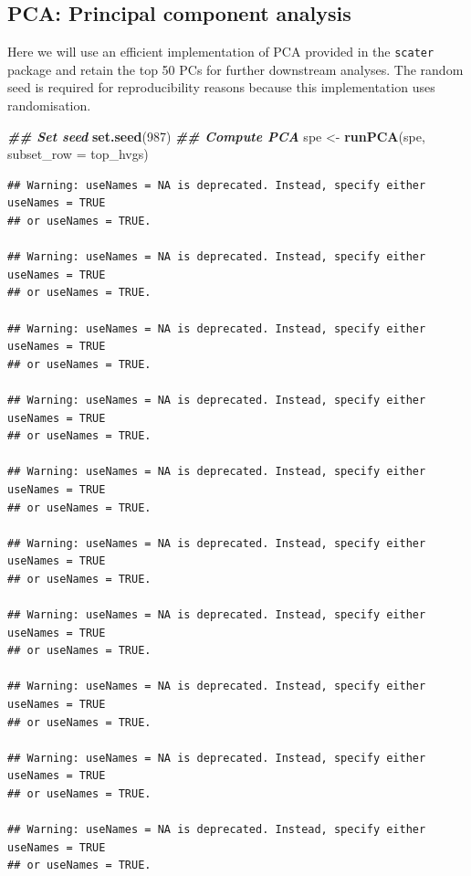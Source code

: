 \documentclass[
]{book}
\newenvironment{Shaded}{\begin{snugshade}}{\end{snugshade}}
\newcommand{\AttributeTok}[1]{\textcolor[rgb]{0.13,0.29,0.53}{#1}}
\newcommand{\DecValTok}[1]{\textcolor[rgb]{0.00,0.00,0.81}{#1}}
\newcommand{\DocumentationTok}[1]{\textcolor[rgb]{0.56,0.35,0.01}{\textbf{\textit{#1}}}}
\newcommand{\FunctionTok}[1]{\textcolor[rgb]{0.13,0.29,0.53}{\textbf{#1}}}
\newcommand{\NormalTok}[1]{#1}
\newcommand{\OtherTok}[1]{\textcolor[rgb]{0.56,0.35,0.01}{#1}}
\begin{document}
\hypertarget{pca-principal-component-analysis}{%
\subsection{PCA: Principal component analysis}\label{pca-principal-component-analysis}}

Here we will use an efficient implementation of PCA provided in the \texttt{scater} package \citep{McCarthy2017Apr} and retain the top 50 PCs for further downstream analyses. The random seed is required for reproducibility reasons because this implementation uses randomisation.

\begin{Shaded}
\begin{Highlighting}[]
\DocumentationTok{\#\# Set seed}
\FunctionTok{set.seed}\NormalTok{(}\DecValTok{987}\NormalTok{)}
\DocumentationTok{\#\# Compute PCA}
\NormalTok{spe }\OtherTok{\textless{}{-}} \FunctionTok{runPCA}\NormalTok{(spe, }\AttributeTok{subset\_row =}\NormalTok{ top\_hvgs)}
\end{Highlighting}
\end{Shaded}

\begin{verbatim}
## Warning: useNames = NA is deprecated. Instead, specify either useNames = TRUE
## or useNames = TRUE.

## Warning: useNames = NA is deprecated. Instead, specify either useNames = TRUE
## or useNames = TRUE.

## Warning: useNames = NA is deprecated. Instead, specify either useNames = TRUE
## or useNames = TRUE.

## Warning: useNames = NA is deprecated. Instead, specify either useNames = TRUE
## or useNames = TRUE.

## Warning: useNames = NA is deprecated. Instead, specify either useNames = TRUE
## or useNames = TRUE.

## Warning: useNames = NA is deprecated. Instead, specify either useNames = TRUE
## or useNames = TRUE.

## Warning: useNames = NA is deprecated. Instead, specify either useNames = TRUE
## or useNames = TRUE.

## Warning: useNames = NA is deprecated. Instead, specify either useNames = TRUE
## or useNames = TRUE.

## Warning: useNames = NA is deprecated. Instead, specify either useNames = TRUE
## or useNames = TRUE.

## Warning: useNames = NA is deprecated. Instead, specify either useNames = TRUE
## or useNames = TRUE.
\end{verbatim}
\end{document}
